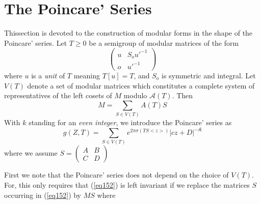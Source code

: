 \chapter{The Poincare' Series}%

This\pageoriginale  section is devoted to the construction of modular
forms in the 
shape of the Poincare' series. Let $T \geq 0$ be a semigroup of modular
matrices of the form 
\begin{equation*}
\begin{pmatrix}
u & S_o u'^{-1} \\
o & u'^{-1}
\end{pmatrix}\tag{150}\label{eq150}
\end{equation*}
where $u$ is a \textit{unit} of $T$ meaning $T[u] = T$, and $S_o$ is
symmetric and integral. Let $V(T)$ denote a set of modular matrices
which constitutes a complete system of representatives of the left
cosets of $M$ modulo $\mathcal{A}(T)$. Then 
\begin{equation*}
M = \sum_{S \in V (T)} A (T) S \tag{151}\label{eq151}
\end{equation*}
With $k$ standing for an \textit{even integer}, we introduce the
Poincare' series as 
\begin{equation*}
g(Z, T) = \sum_{S \in V (T)} e^{2 \pi \sigma (TS < z >)} | cz + D
|^{-\mathfrak{K}} \tag{152}\label{eq152} 
\end{equation*}
where we assume $S = \begin{pmatrix} A & B \\ C & D \end{pmatrix}$ 

First we note that the Poincare' series does not depend on the choice
of $V (T)$. For, this only requires that (\ref{eq152}) is left invariant if
we replace the matrices $S$ occurring in (\ref{eq152}) by $M S$ where 

